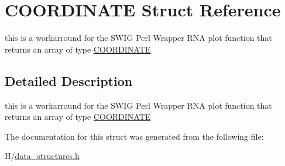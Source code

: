 \hypertarget{structCOORDINATE}{
\section{COORDINATE Struct Reference}
\label{structCOORDINATE}
}


this is a workarround for the SWIG Perl Wrapper RNA plot function that returns an array of type \hyperlink{structCOORDINATE}{COORDINATE}  




\subsection{Detailed Description}
this is a workarround for the SWIG Perl Wrapper RNA plot function that returns an array of type \hyperlink{structCOORDINATE}{COORDINATE} 

The documentation for this struct was generated from the following file:\begin{DoxyCompactItemize}
\item 
H/\hyperlink{data__structures_8h}{data\_\-structures.h}\end{DoxyCompactItemize}
